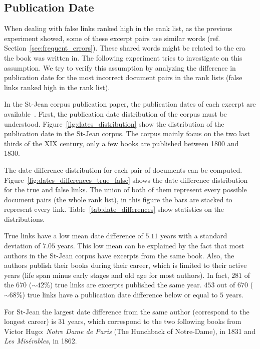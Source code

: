 \subsection{Publication Date}

When dealing with false links ranked high in the rank list, as the previous experiment showed, some of these excerpt pairs use similar words (ref. Section~\ref{sec:frequent_errors}).
These shared words might be related to the era the book was written in.
The following experiment tries to investigate on this assumption.
We try to verify this assumption by analyzing the difference in publication date for the most incorrect document pairs in the rank lists (false links ranked high in the rank list).

In the St-Jean corpus publication paper, the publication dates of each excerpt are available~\cite{st_jean}.
First, the publication date distribution of the corpus must be understood.
Figure~\ref{fig:dates_distribution} show the distribution of the publication date in the St-Jean corpus.
The corpus mainly focus on the two last thirds of the XIX century, only a few books are published between 1800 and 1830.

The date difference distribution for each pair of documents can be computed.
Figure~\ref{fig:dates_differences_true_false} shows the date difference distribution for the true and false links.
The union of both of them represent every possible document pairs (the whole rank list), in this figure the bars are stacked to represent every link.
Table~\ref{tab:date_differences} show statistics on the distributions.

True links have a low mean date difference of $5.11$ years with a standard deviation of $7.05$ years.
This low mean can be explained by the fact that most authors in the St-Jean corpus have excerpts from the same book.
Also, the authors publish their books during their career, which is limited to their active years (life span minus early stages and old age for most authors).
In fact, $281$ of the $670$ ($\sim 42\%$) true links are excerpts published the same year.
$453$ out of $670$ ($\sim 68\%$) true links have a publication date difference below or equal to $5$ years.

For St-Jean the largest date difference from the same author (correspond to the longest career) is $31$ years, which correspond to the two following books from Victor Hugo: \textit{Notre Dame de Paris} (The Hunchback of Notre-Dame), in 1831 and \textit{Les Misérables}, in 1862.

